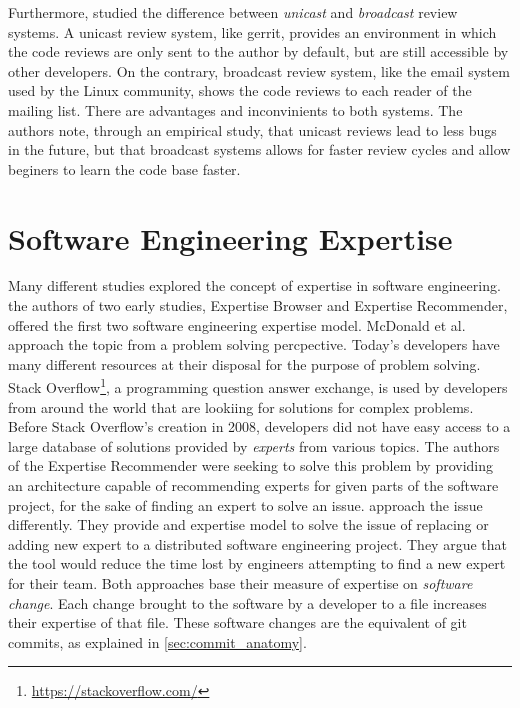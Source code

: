 Furthermore, \citep{armstrong} studied the difference between \textit{unicast} and \textit{broadcast} review systems. A unicast review system, like gerrit, provides an environment in which the code reviews are only sent to the author by default, but are still accessible by other developers. On the contrary, broadcast review system, like the email system used by the Linux community, shows the code reviews to each reader of the mailing list. There are advantages and inconvinients to both systems. The authors note, through an empirical study, that unicast reviews lead to less bugs in the future, but that broadcast systems allows for faster review cycles and allow beginers to learn the code base faster. 



\section{Software Engineering Expertise}
\label{sec:expertise_models}

Many different studies explored the concept of expertise in software engineering. the authors of two early studies, Expertise Browser \citep{mockus02} and Expertise Recommender\citep{McDonald}, offered the first two software engineering expertise model. McDonald et al. approach the topic from a problem solving percpective. Today's developers have many different resources at their disposal for the purpose of problem solving. Stack Overflow\footnote{\url{https://stackoverflow.com/}}, a programming question answer exchange, is used by developers from around the world that are lookiing for solutions for complex problems. Before Stack Overflow's creation in 2008, developers did not have easy access to a large database of solutions provided by \textit{experts} from various topics. The authors of the Expertise Recommender were seeking to solve this problem by providing an architecture capable of recommending experts for given parts of the software project, for the sake of finding an expert to solve an issue. \citep{mockus02} approach the issue differently. They provide and expertise model to solve the issue of replacing or adding new expert to a distributed software engineering project. They argue that the tool would reduce the time lost by engineers attempting to find a new expert for their team. Both approaches base their measure of expertise on \textit{software change}. Each change brought to the software by a developer to a file increases their expertise of that file. These software changes are the equivalent of git commits, as explained in \autoref{sec:commit_anatomy}.


